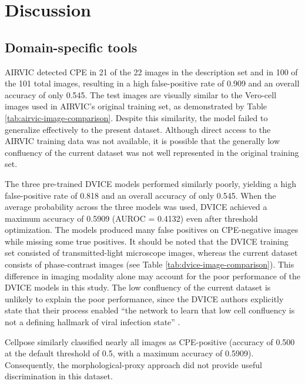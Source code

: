 \documentclass[12pt,a4paper]{article}
\begin{document}


\section{Discussion}

\subsection{Domain-specific tools}
AIRVIC detected CPE in 21 of the 22 images in the description set and in 100 of the 101 total images, resulting in a high false-positive rate of 0.909 and an overall accuracy of only 0.545. The test images are visually similar to the Vero-cell images used in AIRVIC’s original training set, as demonstrated by Table \ref{tab:airvic-image-comparison}. Despite this similarity, the model failed to generalize effectively to the present dataset. Although direct access to the AIRVIC training data was not available, it is possible that the generally low confluency of the current dataset was not well represented in the original training set.



The three pre-trained DVICE models performed similarly poorly, yielding a high false-positive rate of 0.818 and an overall accuracy of only 0.545. When the average probability across the three models was used, DVICE achieved a maximum accuracy of 0.5909 (AUROC = 0.4132) even after threshold optimization. The models produced many false positives on CPE-negative images while missing some true positives. It should be noted that the DVICE training set consisted of transmitted-light microscope images, whereas the current dataset consists of phase-contrast images (see Table \ref{tab:dvice-image-comparison}). This difference in imaging modality alone may account for the poor performance of the DVICE models in this study. The low confluency of the current dataset is unlikely to explain the poor performance, since the DVICE authors explicitly state that their process enabled ``the network to learn that low cell confluency is not a defining hallmark of viral infection state'' \cite{dvice}.



Cellpose similarly classified nearly all images as CPE-positive (accuracy of 0.500 at the default threshold of 0.5, with a maximum accuracy of 0.5909). Consequently, the morphological-proxy approach did not provide useful discrimination in this dataset.
\end{document}
